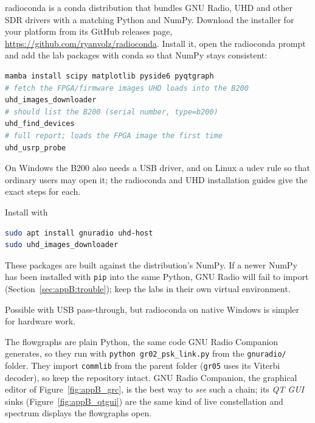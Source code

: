 \begin{description}[leftmargin=1.2em,itemsep=3pt,font=\normalfont\bfseries]
\item[radioconda (recommended, all platforms).] radioconda is a conda distribution that bundles GNU
Radio, UHD and other SDR drivers with a matching Python and NumPy. Download the installer for your
platform from its GitHub releases page,
\url{https://github.com/ryanvolz/radioconda}. Install it, open the radioconda prompt and add the lab packages with conda so that NumPy stays consistent:
\begin{lstlisting}[language=bash]
mamba install scipy matplotlib pyside6 pyqtgraph
# fetch the FPGA/firmware images UHD loads into the B200
uhd_images_downloader
# should list the B200 (serial number, type=b200)
uhd_find_devices
# full report; loads the FPGA image the first time
uhd_usrp_probe
\end{lstlisting}
On Windows the B200 also needs a USB driver, and on Linux a udev rule so that ordinary users may open
it; the radioconda and UHD installation guides give the exact steps for each.
\item[Ubuntu and Debian packages.] Install with
\begin{lstlisting}[language=bash]
sudo apt install gnuradio uhd-host
sudo uhd_images_downloader
\end{lstlisting} These packages are built against the distribution's NumPy.
If a newer NumPy has been installed with \texttt{pip} into the same Python, GNU Radio will fail to
import (Section~\ref{sec:appB:trouble}); keep the labs in their own virtual environment.
\item[Windows Subsystem for Linux.] Possible with USB pass-through, but radioconda on native Windows
is simpler for hardware work.
\end{description}

The flowgraphs are plain Python, the same code GNU Radio Companion generates, so they run with
\texttt{python gr02\_psk\_link.py} from the \texttt{gnuradio/} folder. They import \texttt{commlib} from
the parent folder (\texttt{gr05} uses its Viterbi decoder), so keep the repository intact.
GNU Radio Companion, the graphical editor of Figure~\ref{fig:appB_grc}, is the best way to
\emph{see} such a chain; its \emph{QT GUI} sinks (Figure~\ref{fig:appB_qtgui}) are the same kind of
live constellation and spectrum displays the flowgraphs open.


